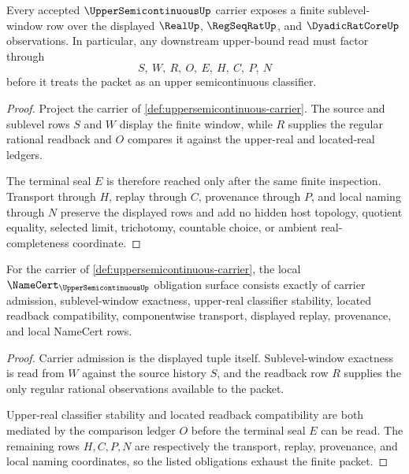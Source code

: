 \begin{theorem}\label{thm:upper-semicontinuous-carrier-window}
Every accepted $\UpperSemicontinuousUp$ carrier exposes a finite sublevel-window row over the displayed $\RealUp$, $\RegSeqRatUp$, and $\DyadicRatCoreUp$ observations. In particular, any downstream upper-bound read must factor through
$$
S,\ W,\ R,\ O,\ E,\ H,\ C,\ P,\ N
$$
before it treats the packet as an upper semicontinuous classifier.
\end{theorem}
\begin{proof}
Project the carrier of \autoref{def:uppersemicontinuous-carrier}. The source and sublevel rows $S$ and $W$ display the finite window, while $R$ supplies the regular rational readback and $O$ compares it against the upper-real and located-real ledgers.

The terminal seal $E$ is therefore reached only after the same finite inspection. Transport through $H$, replay through $C$, provenance through $P$, and local naming through $N$ preserve the displayed rows and add no hidden host topology, quotient equality, selected limit, trichotomy, countable choice, or ambient real-completeness coordinate.
\end{proof}

\begin{theorem}\label{thm:upper-semicontinuous-namecert-obligations}
For the carrier of \autoref{def:uppersemicontinuous-carrier}, the local $\NameCert_{\UpperSemicontinuousUp}$ obligation surface consists exactly of carrier admission, sublevel-window exactness, upper-real classifier stability, located readback compatibility, componentwise transport, displayed replay, provenance, and local NameCert rows.
\end{theorem}
\begin{proof}
Carrier admission is the displayed tuple itself. Sublevel-window exactness is read from $W$ against the source history $S$, and the readback row $R$ supplies the only regular rational observations available to the packet.

Upper-real classifier stability and located readback compatibility are both mediated by the comparison ledger $O$ before the terminal seal $E$ can be read. The remaining rows $H,C,P,N$ are respectively the transport, replay, provenance, and local naming coordinates, so the listed obligations exhaust the finite packet.
\end{proof}

